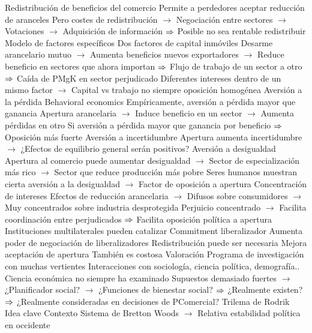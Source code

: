 \documentclass{nuevotema}
\begin{document}
\begin{esquemal}
			\3 Redistribución de beneficios del comercio
				\4 Permite a perdedores aceptar reducción de aranceles
				\4 Pero costes de redistribución
				\4[] $\to$ Negociación entre sectores
				\4[] $\to$ Votaciones
				\4[] $\to$ Adquisición de información
				\4[] $\Rightarrow$ Posible no sea rentable redistribuir
			\3 Modelo de factores específicos
				\4 Dos factores de capital inmóviles
				\4 Desarme arancelario mutuo
				\4[] $\to$ Aumenta beneficios nuevos exportadores
				\4[] $\to$ Reduce beneficio en sectores que ahora importan
				\4[] $\Rightarrow$ Flujo de trabajo de un sector a otro
				\4[] $\Rightarrow$ Caída de PMgK en sector perjudicado
				\4[] Diferentes intereses dentro de un mismo factor
				\4[] $\to$ Capital vs trabajo no siempre oposición homogénea
			\3 Aversión a la pérdida
				\4 Behavioral economics
				\4[] Empíricamente, aversión a pérdida mayor que ganancia
				\4 Apertura arancelaria
				\4[] $\to$ Induce beneficio en un sector
				\4[] $\to$ Aumenta pérdidas en otro
				\4 Si aversión a pérdida mayor que ganancia por beneficio
				\4[] $\Rightarrow$ Oposición más fuerte
			\3 Aversión a incertidumbre
				\4 Apertura aumenta incertidumbre
				\4[] $\to$ ¿Efectos de equilibrio general serán positivos?
			\3 Aversión a desigualdad
				\4 Apertura al comercio puede aumentar desigualdad
				\4[] $\to$ Sector de especialización más rico
				\4[] $\to$ Sector que reduce producción más pobre
				\4 Seres humanos muestran cierta aversión a la desigualdad
				\4[] $\to$ Factor de oposición a apertura
			\3 Concentración de intereses
				\4 Efectos de reducción arancelaria
				\4[] $\to$ Difusos sobre consumidores
				\4[] $\to$ Muy concentrados sobre industria desprotegida
				\4 Perjuicio concentrado
				\4[] $\to$ Facilita coordinación entre perjudicados
				\4[] $\Rightarrow$ Facilita oposición política a apertura
			\3 Instituciones multilaterales pueden catalizar
				\4 Commitment liberalizador
				\4[] Aumenta poder de negociación de liberalizadores
			\3 Redistribución puede ser necesaria
				\4 Mejora aceptación de apertura
				\4[] También es costosa
			\3 Valoración
				\4 Programa de investigación con muchas vertientes
				\4 Interacciones con sociología, ciencia política, demografía..
				\4 Ciencia económica no siempre ha examinado
				\4[] Supuestos demasiado fuertes
				\4[] $\to$ ¿Planificador social?
				\4[] $\to$ ¿Funciones de bienestar social?
				\4[] $\Rightarrow$ ¿Realmente existen?
				\4[] $\Rightarrow$ ¿Realmente consideradas en decisiones de PComercial?
		\2 Trilema de Rodrik
			\3 Idea clave
				\4 Contexto
				\4[] Sistema de Bretton Woods
				\4[] $\to$ Relativa estabilidad política en occidente

\end{esquemal}
\end{document}
